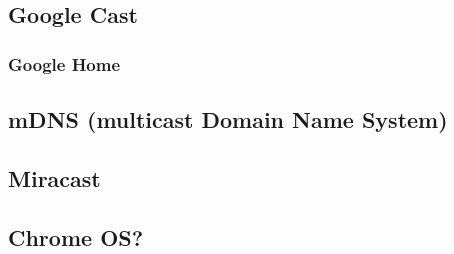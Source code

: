 \subsection{Google Cast}
\subsubsection{Google Home}

\subsection{mDNS (multicast Domain Name System)}


\subsection{Miracast}



\subsection{Chrome OS?}